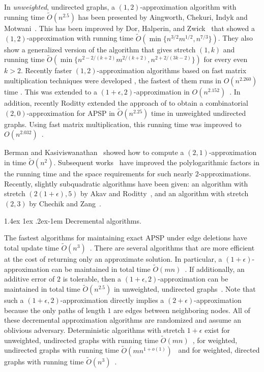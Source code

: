 \documentclass[11pt]{article}
\makeatletter
\theoremstyle{definition}
\theoremstyle{remark}
\renewcommand{\paragraph}{%
  \@startsection{paragraph}{4}%
  {\z@}{1.4ex \@plus 1ex \@minus .2ex}{-1em}%
  {\normalfont\normalsize\bfseries}%
}
\makeatother
\begin{document}
In \emph{unweighted}, undirected graphs, a $ (1, 2) $-approximation algorithm with running time $ \tilde O (n^{2.5}) $ has been presented by Aingworth, Chekuri, Indyk and Motwani~\cite{AingworthCIM99}. This has been improved by Dor, Halperin, and Zwick~\cite{DHZ00} that showed a $(1,2)$-approximation with running time $\tilde{O}(\min\{n^{3/2}m^{1/2}, n^{7/3} \})$. They also show a generalized version of the algorithm that gives stretch $ (1, k) $ and running time ${\tilde{O}}(\min\{n^{2-{2}/{(k+2)}}m^{{2}/{(k+2)}}, n^{2+{2}/{(3k-2)}}\})$ for every even $k>2$.
Recently faster $(1,2)$-approximation algorithms based on fast matrix multiplication techniques were developed \cite{DengKRWZ22,durr2023improved}, the fastest of them runs in $O(n^{2.260})$ time \cite{durr2023improved}. This was extended to a $(1+\epsilon,2)$-approximation in $O(n^{2.152})$~\cite{DoryFKNVV23}. In addition, recently Roditty \cite{Roditty23} extended the approach of \cite{DHZ00} to obtain a combinatorial $(2,0)$-approximation for APSP in $\tilde{O}(n^{2.25})$ time in unweighted undirected graphs.  Using fast matrix multiplication, this running time was improved to $O(n^{2.032})$~\cite{DoryFKNVV23,saha2024faster}.


Berman and Kasiviswanathan~\cite{BermanK07} showed how to compute a $ (2, 1) $-approximation in time $ \tilde O (n^2) $.
Subsequent works~\cite{BaswanaGS09,BaswanaK10,PatrascuR14,Sommer16,Knudsen17} have improved the polylogarithmic factors in the running time and the space requirements for such nearly $2$-approximations.
Recently, slightly subquadratic algorithms have been given: an algorithm with stretch $ (2 (1 + \epsilon), 5)$ by Akav and Roditty~\cite{AkavR20}, and an algorithm with stretch $(2,3)$ by Chechik and Zang~\cite{ChechikZ22}.




\paragraph{Decremental algorithms.}

The fastest algorithms for maintaining exact APSP under edge deletions have total update time $ \tilde O (n^3) $~\cite{DemetrescuI06,BaswanaHS07,EvaldFGW21}.
There are several algorithms that are more efficient at the cost of returning only an approximate solution.
In particular, a $ (1+\epsilon) $-approximation can be maintained in total time $ \tilde O (m n) $~\cite{RZ12,Bernstein16,KarczmarzL19}.
If additionally, an additive error of $ 2 $ is tolerable, then a $ (1+\epsilon, 2) $-approximation can be maintained in total time $ \tilde O (n^{2.5}) $ in unweighted, undirected graphs~\cite{HKN2016,AbrahamC13}.
Note that such a $ (1+\epsilon, 2) $-approximation directly implies a $ (2 + \epsilon) $-approximation because the only paths of length $ 1 $ are edges between neighboring nodes.
All of these decremental approximation algorithms are randomized and assume an oblivious adversary.
Deterministic algorithms with stretch $ 1 + \epsilon $ exist for unweighted, undirected graphs with running time $ \tilde O (m n) $~\cite{HKN2016}, for weighted, undirected graphs with running time $ \tilde O (m n^{1+o(1)})$~\cite{BernsteinGS21} and for weighted, directed graphs with running time $ \tilde O (n^3) $~\cite{KarczmarzL20}.
\end{document}
